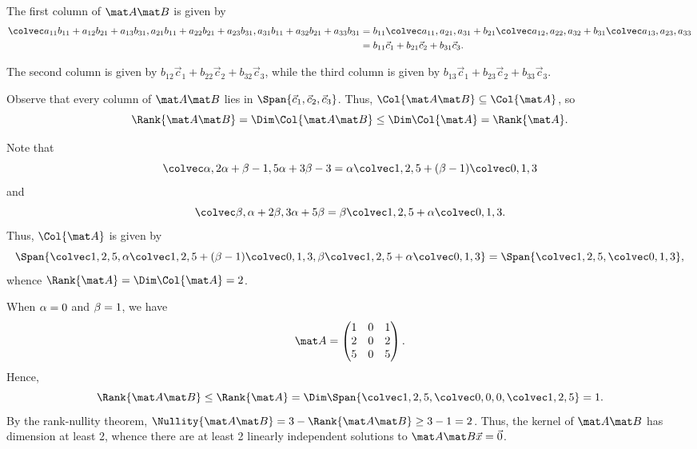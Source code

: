 \begin{solution}
    \begin{ppart}
        The first column of $\mat A \mat B$ is given by
        \begin{align*}
            \cveciii{a_{11}b_{11} + a_{12}b_{21} + a_{13} b_{31}}{a_{21}b_{11} + a_{22}b_{21} + a_{23}b_{31}}{a_{31}b_{11} + a_{32}b_{21} + a_{33}b_{31}} &= b_{11} \cveciii{a_{11}}{a_{21}}{a_{31}} + b_{21} \cveciii{a_{12}}{a_{22}}{a_{32}} + b_{31} \cveciii{a_{13}}{a_{23}}{a_{33}}\\
            &= b_{11} \vec c_1 + b_{21} \vec c_2 + b_{31} \vec c_3.
        \end{align*}
    \end{ppart}
    \begin{ppart}
        The second column is given by $b_{12} \vec c_1 + b_{22} \vec c_2 + b_{32} \vec c_3$, while the third column is given by $b_{13} \vec c_1 + b_{23} \vec c_2 + b_{33} \vec c_3$.

        Observe that every column of $\mat A \mat B$ lies in $\Span{\vec c_1, \vec c_2, \vec c_3}$. Thus, $\Col{\mat A \mat B} \subseteq \Col{\mat A}$, so \[\Rank{\mat A \mat B} = \Dim \Col{\mat A \mat B} \leq \Dim \Col{\mat A} = \Rank{\mat A}.\]
    \end{ppart}
    \begin{ppart}
        \begin{psubpart}
            Note that \[\cveciii{\a}{2\a + \b - 1}{5\a + 3\b - 3} = \a \cveciii125 + (\b - 1) \cveciii013\] and \[\cveciii{\b}{\a + 2\b}{3\a + 5\b} = \b\cveciii125 + \a \cveciii013.\] Thus, $\Col{\mat A}$ is given by \[\Span{\cveciii125, \a \cveciii125 + (\b - 1) \cveciii013, \b\cveciii125 + \a \cveciii013} = \Span{\cveciii125, \cveciii013},\] whence $\Rank{\mat A} = \Dim \Col{\mat A} = 2$.
        \end{psubpart}
        \begin{psubpart}
            When $\alpha = 0$ and $\beta = 1$, we have \[\mat A = \begin{pmatrix}1 & 0 & 1 \\ 2 & 0 & 2 \\ 5 & 0 & 5 \end{pmatrix}.\] Hence, \[\Rank{\mat A \mat B} \leq \Rank{\mat A} = \Dim \Span{\cveciii125, \cveciii000, \cveciii125} = 1.\] By the rank-nullity theorem, $\Nullity{\mat A \mat B} = 3 - \Rank{\mat A \mat B} \geq 3 - 1 = 2$. Thus, the kernel of $\mat A \mat B$ has dimension at least 2, whence there are at least 2 linearly independent solutions to $\mat A \mat B \vec x = \vec 0$.
        \end{psubpart}
    \end{ppart}
\end{solution}

